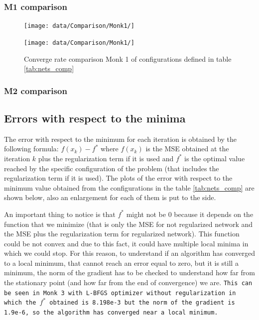 \subsubsection{M1 comparison}


\begin{figure}[H]
	\centering
	\begin{minipage}[t]{0.5\linewidth}		\texttt{[image: data/Comparison/Monk1/]}
	\end{minipage}%
	\begin{minipage}[t]{0.5\linewidth}
		\texttt{[image: data/Comparison/Monk1/]}
	\end{minipage}
	\caption{Converge rate comparison Monk 1 of configurations defined in table \ref{tab:nets_comp}}
	\label{CR-Monk1}
\end{figure}

\subsubsection{M2 comparison}

\subsection{Errors with respect to the minima}
\label{sec:minimum_error}
The error with respect to the minimum for each iteration is obtained by the following formula: $ f(x_k) - f^*$ where  $f(x_{k})$ is the MSE obtained at the iteration $k$ plus the  regularization term if it is used and $f^*$ is the optimal value reached by the specific configuration of the problem (that includes the regularization term if it is used). The plots of the error with respect to the minimum value obtained from the configurations in the table \ref{tab:nets_comp} are shown below, also an enlargement for each of them is put to the side.

An important thing to notice is that $f^*$ might not be 0 because it depends on the function that we minimize (that is only the MSE for not regularized network and the MSE plus the regularization term for regularized network). This function could be not convex and due to this fact, it could have multiple local minima in which we could stop. For this reason, to understand if an algorithm has converged to a local minimum, that cannot reach an error equal to zero, but it is still a minimum, the norm of the gradient has to be checked to understand how far from the stationary point (and how far from the end of convergence) we are. \texttt{This can be seen in Monk 3 with L-BFGS optimizer without regularization in which the $f^*$ obtained is 8.198e-3 but the norm of the gradient is 1.9e-6, so the algorithm has converged near a local minimum.}

